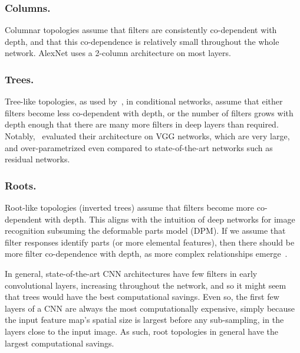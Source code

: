 \documentclass[thesis]{subfiles}
\begin{document}
	\subsubsection{Columns.} Columnar topologies assume that filters are consistently co-dependent with depth, and that this co-dependence is relatively small throughout the whole network. AlexNet uses a 2-column architecture on most layers.
	
	\subsubsection{Trees.} Tree-like topologies, as used by~\citet{Ioannou2016},  in conditional networks, assume that either filters become less co-dependent with depth, or the number of filters grows with depth enough that there are many more filters in deep layers than required. Notably,~\citet{Ioannou2016} evaluated their architecture on VGG networks, which are very large, and over-parametrized even compared to state-of-the-art networks such as residual networks.
	
	\subsubsection{Roots.} Root-like topologies (\ie inverted trees) assume that filters become more co-dependent with depth.  This aligns with the intuition of deep networks for image recognition subsuming the deformable parts model (DPM). If we assume that filter responses identify parts (or more elemental features), then there should be more filter co-dependence with depth, as more complex relationships emerge~\cite{girshick2015deformable}.
	
	In general, state-of-the-art CNN architectures have few filters in early convolutional layers, increasing throughout the network, and so it might seem that trees would have the best computational savings. Even so, the first few layers of a CNN are always the most computationally expensive, simply because the input feature map's spatial size is largest before any sub-sampling, in the layers close to the input image. As such, root topologies in general have the largest computational savings.
	
	
\end{document}
